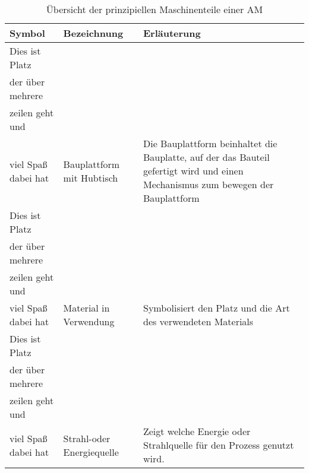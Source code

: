 \documentclass[12pt,a4paper]{article}
\begin{document}
 
   \begin{table} 
      \caption{Übersicht der prinzipiellen Maschinenteile einer AM} 
      \centering 
      \label{uebersicht} 
      \begin{tabularx}{\textwidth}{>{\centering}XlX} 
         \toprule 
         Symbol & Bezeichnung  & Erläuterung   \\ \midrule 
         Dies ist Platz\\der über mehrere\\ zeilen geht und\\viel Spaß dabei hat & Bauplattform mit Hubtisch &   Die Bauplattform beinhaltet die Bauplatte, auf der das Bauteil gefertigt wird und einen Mechanismus zum bewegen der Bauplattform\\ 
         Dies ist Platz\\der über mehrere\\ zeilen geht und\\viel Spaß dabei hat & Material in Verwendung & Symbolisiert den Platz und die Art des verwendeten Materials   \\ 
         Dies ist Platz\\der über mehrere\\ zeilen geht und\\viel Spaß dabei hat & Strahl-oder Energiequelle & Zeigt welche Energie oder Strahlquelle für den Prozess genutzt wird.   \\ 
         \bottomrule 
      \end{tabularx} 
   \end{table} 
\end{document}
